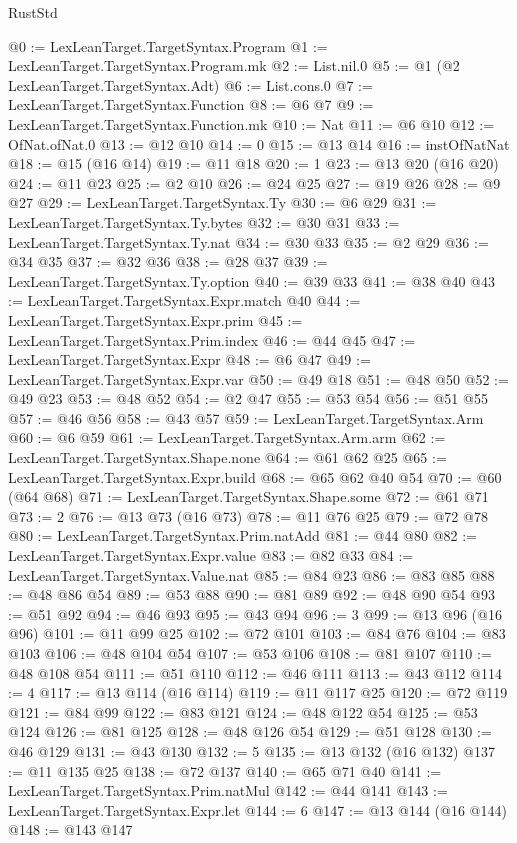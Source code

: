 \begin{lexlean}{RustStd}
\begin{coremodule}
@0 := LexLeanTarget.TargetSyntax.Program
@1 := LexLeanTarget.TargetSyntax.Program.mk
@2 := List.nil.{0}
@5 := @1 (@2 LexLeanTarget.TargetSyntax.Adt)
@6 := List.cons.{0}
@7 := LexLeanTarget.TargetSyntax.Function
@8 := @6 @7
@9 := LexLeanTarget.TargetSyntax.Function.mk
@10 := Nat
@11 := @6 @10
@12 := OfNat.ofNat.{0}
@13 := @12 @10
@14 := 0
@15 := @13 @14
@16 := instOfNatNat
@18 := @15 (@16 @14)
@19 := @11 @18
@20 := 1
@23 := @13 @20 (@16 @20)
@24 := @11 @23
@25 := @2 @10
@26 := @24 @25
@27 := @19 @26
@28 := @9 @27
@29 := LexLeanTarget.TargetSyntax.Ty
@30 := @6 @29
@31 := LexLeanTarget.TargetSyntax.Ty.bytes
@32 := @30 @31
@33 := LexLeanTarget.TargetSyntax.Ty.nat
@34 := @30 @33
@35 := @2 @29
@36 := @34 @35
@37 := @32 @36
@38 := @28 @37
@39 := LexLeanTarget.TargetSyntax.Ty.option
@40 := @39 @33
@41 := @38 @40
@43 := LexLeanTarget.TargetSyntax.Expr.match @40
@44 := LexLeanTarget.TargetSyntax.Expr.prim
@45 := LexLeanTarget.TargetSyntax.Prim.index
@46 := @44 @45
@47 := LexLeanTarget.TargetSyntax.Expr
@48 := @6 @47
@49 := LexLeanTarget.TargetSyntax.Expr.var
@50 := @49 @18
@51 := @48 @50
@52 := @49 @23
@53 := @48 @52
@54 := @2 @47
@55 := @53 @54
@56 := @51 @55
@57 := @46 @56
@58 := @43 @57
@59 := LexLeanTarget.TargetSyntax.Arm
@60 := @6 @59
@61 := LexLeanTarget.TargetSyntax.Arm.arm
@62 := LexLeanTarget.TargetSyntax.Shape.none
@64 := @61 @62 @25
@65 := LexLeanTarget.TargetSyntax.Expr.build
@68 := @65 @62 @40 @54
@70 := @60 (@64 @68)
@71 := LexLeanTarget.TargetSyntax.Shape.some
@72 := @61 @71
@73 := 2
@76 := @13 @73 (@16 @73)
@78 := @11 @76 @25
@79 := @72 @78
@80 := LexLeanTarget.TargetSyntax.Prim.natAdd
@81 := @44 @80
@82 := LexLeanTarget.TargetSyntax.Expr.value
@83 := @82 @33
@84 := LexLeanTarget.TargetSyntax.Value.nat
@85 := @84 @23
@86 := @83 @85
@88 := @48 @86 @54
@89 := @53 @88
@90 := @81 @89
@92 := @48 @90 @54
@93 := @51 @92
@94 := @46 @93
@95 := @43 @94
@96 := 3
@99 := @13 @96 (@16 @96)
@101 := @11 @99 @25
@102 := @72 @101
@103 := @84 @76
@104 := @83 @103
@106 := @48 @104 @54
@107 := @53 @106
@108 := @81 @107
@110 := @48 @108 @54
@111 := @51 @110
@112 := @46 @111
@113 := @43 @112
@114 := 4
@117 := @13 @114 (@16 @114)
@119 := @11 @117 @25
@120 := @72 @119
@121 := @84 @99
@122 := @83 @121
@124 := @48 @122 @54
@125 := @53 @124
@126 := @81 @125
@128 := @48 @126 @54
@129 := @51 @128
@130 := @46 @129
@131 := @43 @130
@132 := 5
@135 := @13 @132 (@16 @132)
@137 := @11 @135 @25
@138 := @72 @137
@140 := @65 @71 @40
@141 := LexLeanTarget.TargetSyntax.Prim.natMul
@142 := @44 @141
@143 := LexLeanTarget.TargetSyntax.Expr.let
@144 := 6
@147 := @13 @144 (@16 @144)
@148 := @143 @147

\end{coremodule}
\end{lexlean}
